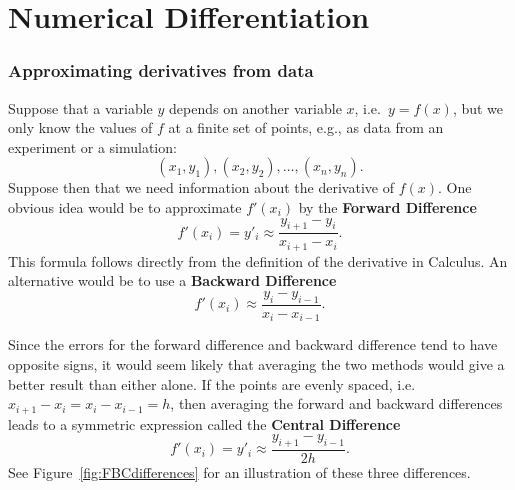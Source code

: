 %
%
%
%
%
%
%
%
%
%
%
%
%
%


\chapter{Numerical Differentiation}



\subsection*{Approximating derivatives from data}


Suppose that a variable $y$ depends on another variable $x$,
i.e.~$y = f(x)$, but we only know the values of $f$
at a finite set of points, e.g., as data from an experiment
or a simulation:
$$
 (x_1,y_1), (x_2,y_2), \ldots, (x_n,y_n).
$$
Suppose then that we need information about the derivative of $f(x)$.
One obvious idea would be to approximate $f'(x_i)$ by the {\bf Forward
  Difference}
$$
f'(x_i) = y'_i \approx \frac{y_{i+1} - y_i}{x_{i+1}-x_i}.
$$
This formula follows directly from the definition of the derivative in
Calculus.  An alternative would be to use a {\bf Backward Difference}
$$
f'(x_i) \approx \frac{y_i - y_{i-1}}{x_i-x_{i-1}}.
$$

Since the errors for the  forward difference and backward difference tend
to have opposite signs, it would seem likely that averaging the two
methods would give a better result than either alone. If the points are
evenly spaced, i.e.\ $x_{i+1}-x_i = x_i-x_{i-1} = h$, then averaging the
forward and backward differences leads to a symmetric expression called
the {\bf Central Difference}
$$
f'(x_i) = y'_i \approx \frac{y_{i+1} - y_{i-1}}{2h}.
$$
See Figure~\ref{fig:FBCdifferences} for an illustration of these three differences.

